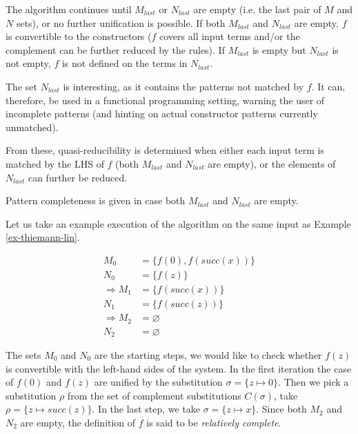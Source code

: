 The algorithm continues until $M_{last}$ or $N_{last}$ are empty (i.e. the last pair of $M$ and $N$ sets), or no further unification is possible. If both $M_{last}$ and $N_{last}$ are empty, $f$ is convertible to the constructors ($f$ covers all input terms and/or the complement can be further reduced by the rules). If $M_{last}$ is empty but $N_{last}$ is not empty, $f$ is not defined on the terms in $N_{last}$.

The set $N_{last}$ is interesting, as it contains the patterns not matched by $f$. It can, therefore, be used in a functional programming setting, warning the user of incomplete patterns (and hinting on actual constructor patterns currently unmatched).

From these, quasi-reducibility is determined when either each input term is matched by the LHS of $f$ (both $M_{last}$ and $N_{last}$ are empty), or the elements of $N_{last}$ can further be reduced.

Pattern completeness is given in case both $M_{last}$ and $N_{last}$ are empty.

\begin{example} Let us take an example execution of the algorithm on the same input as Example \ref{ex-thiemann-lin}.

\begin{align*}
    M_0 &= \{f(0), f(succ(x))\} \\
    N_0 &= \{f(z)\} \\
    \Rightarrow M_1 &= \{f(succ(x))\} \\
    N_1 &= \{f(succ(z))\} \\
    \Rightarrow M_2 &= \varnothing \\
    N_2 &= \varnothing
\end{align*}

The sets $M_0$ and $N_0$ are the starting steps, we would like to check whether $f(z)$ is convertible with the left-hand sides of the system. In the first iteration the case of $f(0)$ and $f(z)$ are unified by the substitution $\sigma = \{z \mapsto 0\}$. Then we pick a substitution $\rho$ from the set of complement substitutions $C(\sigma)$, take $\rho = \{z \mapsto succ(z)\}$. In the last step, we take $\sigma = \{z \mapsto x\}$. Since both $M_2$ and $N_2$ are empty, the definition of $f$ is said to be \textit{relatively complete}.
\end{example}

